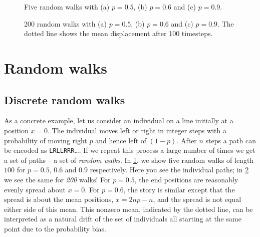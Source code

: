 \documentclass[main.tex]{subfiles}
\begin{document}
\begin{figure}
\centering
\begin{subfigure}[t]{0.26\textwidth}
	\centering
	
\end{subfigure}
\begin{subfigure}[t]{0.25\textwidth}
	\centering
	
\end{subfigure}
\begin{subfigure}[t]{0.45\textwidth}
	\centering
	
\end{subfigure}
\caption{Five random walks with (a) $p=0.5$, (b) $p=0.6$ and (c) $p=0.9$.}
\label{ranfive}
\end{figure}
\begin{figure}
\centering
\begin{subfigure}[t]{0.27\textwidth}
	\centering
	
\end{subfigure}
\begin{subfigure}[t]{0.25\textwidth}	
	\centering
	
\end{subfigure}
\begin{subfigure}[t]{0.45\textwidth}
	\centering
	
\end{subfigure}
\caption{200 random walks with (a) $p=0.5$, (b) $p=0.6$ and (c) $p= 0.9$. The dotted line shows the mean displacement after 100 timesteps.}
\label{rantwohun}
\end{figure}

\section{Random walks}
\subsection{Discrete random walks}
As a concrete example, let us consider an individual on a line initially at a position $x=0$. The individual moves left or right in integer steps with a probability of moving right $p$ and hence left of $(1-p)$. After $n$ steps a path can be encoded as \texttt{LRLLRRR}\dots. If we repeat this process a large number of times we get a set of paths -- a set of \emph{random walks}. In \cref{ranfive}, we show five random walks of length $100$ for $p=0.5$, $0.6$ and $0.9$ respectively. Here you see the individual paths; in \cref{rantwohun} we see the same for \emph{200} walks! For $p=0.5$, the end positions are reasonably evenly spread about $x=0$. For $p=0.6$, the story is similar except that the spread is about the mean positions, $x=2np-n$, and the spread is not equal either side of this mean. This nonzero mean, indicated by the dotted line, can be interpreted as a natural drift of the set of individuals all starting at the same point due to the probability bias.
\end{document}
